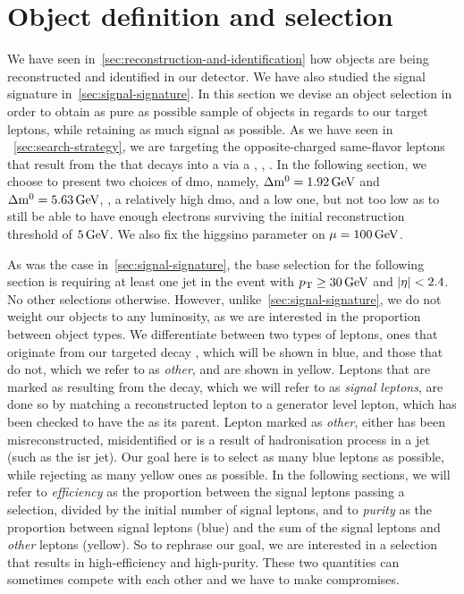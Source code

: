 \section{Object definition and selection}
We have seen in~\ref{sec:reconstruction-and-identification} how objects are being reconstructed and identified in our detector. We have also studied the signal signature in~\ref{sec:signal-signature}. In this section we devise an object selection in order to obtain as pure as possible sample of objects in regards to our target leptons, while retaining as much signal as possible. As we have seen in ~\ref{sec:search-strategy}, we are targeting the opposite-charged same-flavor leptons \ellell that result from the \neutt that decays into a \neuto via a \PZstar, \ie, \neuttdecay. In the following section, we choose to present two choices of \gls{dmo}, namely, $\Delta\mathrm{m}^0=1.92\,\text{Ge\hspace{-.08em}V}$ and $\Delta\mathrm{m}^0=5.63\,\text{Ge\hspace{-.08em}V}$, \ie, a relatively high \gls{dmo}, and a low one, but not too low as to still be able to have enough electrons surviving the initial reconstruction \pt threshold of $5\,\text{Ge\hspace{-.08em}V}$. We also fix the higgsino parameter on $\mu=100\,\text{Ge\hspace{-.08em}V}$.

As was the case in~\ref{sec:signal-signature}, the base selection for the following section is requiring at least one jet in the event with $p_{\mathrm{T}} \geq 30\,\text{Ge\hspace{-.08em}V}$ and $\lvert \eta \rvert<2.4$. No other selections otherwise. However, unlike~\ref{sec:signal-signature}, we do not weight our objects to any luminosity, as we are interested in the proportion between object types. We differentiate between two types of leptons, ones that originate from our targeted decay \neuttdecay, which will be shown in blue, and those that do not, which we refer to as \emph{other}, and are shown in yellow. Leptons that are marked as resulting from the \neuttdecay decay, which we will refer to as \emph{signal leptons}, are done so by matching a reconstructed lepton to a generator level lepton, which has been checked to have the \neutt as its parent. Lepton marked as \emph{other}, either has been misreconstructed, misidentified or is a result of hadronisation process in a jet (such as the \gls{isr} jet). Our goal here is to select as many blue leptons as possible, while rejecting as many yellow ones as possible. In the following sections, we will refer to \emph{efficiency} as the proportion between the signal leptons passing a selection, divided by the initial number of signal leptons, and to \emph{purity} as the proportion between signal leptons (blue) and the sum of the signal leptons and \emph{other} leptons (yellow). So to rephrase our goal, we are interested in a selection that results in high-efficiency and high-purity. These two quantities can sometimes compete with each other and we have to make compromises.

